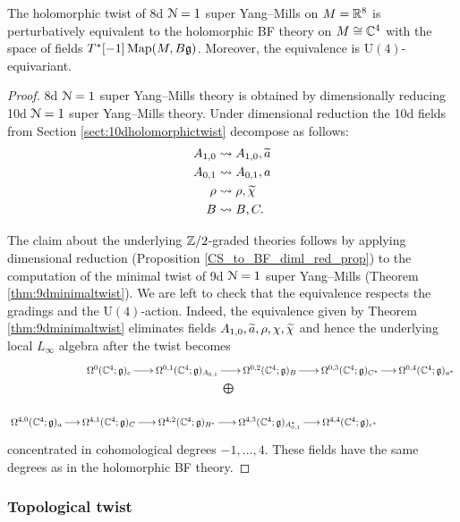 \documentclass[10pt, oneside]{article}
\renewcommand{\U}{\mathrm{U}}
\begin{document}
\begin{theorem}
The holomorphic twist of 8d $\mathcal N=1$ super Yang--Mills on $M=\mathbb R^8$ is perturbatively equivalent to the holomorphic BF theory on $M\cong\mathbb C^4$ with the space of fields $T^*[-1]\operatorname{Map}(M, B\mathfrak g)$. Moreover, the equivalence is $\U(4)$-equivariant.
\label{thm:8dholomorphictwist}
\end{theorem}
\begin{proof}
8d $\mathcal N=1$ super Yang--Mills theory is obtained by dimensionally reducing 10d $\mathcal N=1$ super Yang--Mills theory. Under dimensional reduction the 10d fields from Section \ref{sect:10dholomorphictwist} decompose as follows:
\begin{align*}
A_{1, 0}&\rightsquigarrow A_{1, 0}, \widetilde{a} \\
A_{0, 1}&\rightsquigarrow A_{0, 1}, a \\
\rho&\rightsquigarrow \rho, \widetilde{\chi} \\
B&\rightsquigarrow B, C.
\end{align*}

The claim about the underlying $\mathbb Z/2$-graded theories follows by applying dimensional reduction (Proposition \ref{CS_to_BF_diml_red_prop}) to the computation of the minimal twist of 9d $\mathcal N=1$ super Yang--Mills (Theorem \ref{thm:9dminimaltwist}). We are left to check that the equivalence respects  the gradings and the $\U(4)$-action. Indeed, the equivalence given by Theorem \ref{thm:9dminimaltwist} eliminates fields $A_{1, 0}, \widetilde{a}, \rho, \chi, \widetilde{\chi}$ and hence the underlying local $L_\infty$ algebra after the twist becomes
\[
\xymatrix@R=0.5cm@C=0.5cm{
&\Omega^0(\CC^4; \gg)_c \ar[r] &\Omega^{0,1}(\CC^4; \gg)_{A_{0,1}} \ar[r] &\Omega^{0,2}(\CC^4; \gg)_{B} \ar[r] &\Omega^{0,3}(\CC^4; \gg)_{C^*} \ar[r] &\Omega^{0,4}(\CC^4; \gg)_{a^*} \\
&&\ar@{}^{\bigoplus}[r] &&& \\
\Omega^{4,0}(\CC^4; \gg)_{a} \ar[r] &\Omega^{4,1}(\CC^4; \gg)_C \ar[r] &\Omega^{4,2}(\CC^4; \gg)_{B^*} \ar[r] &\Omega^{4,3}(\CC^4; \gg)_{A_{0,1}^*} \ar[r] &\Omega^{4,4}(\CC^4; \gg)_{c^*}&
}
\]
concentrated in cohomological degrees $-1, \dots, 4$. These fields have the same degrees as in the holomorphic BF theory.
\end{proof}

\subsubsection{Topological twist}
\label{sect:8dtopologicaltwist}
\end{document}
